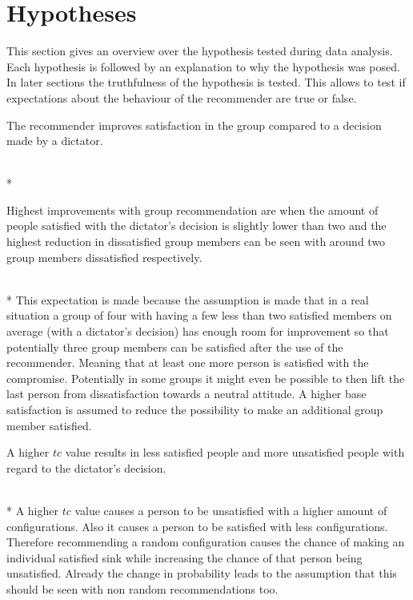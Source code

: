 \section{Hypotheses}
\label{sec:Evaluation:Hypotheses}

This section gives an overview over the hypothesis tested during data analysis. Each hypothesis is followed by an explanation to why the hypothesis was posed. In later sections the truthfulness of the hypothesis is tested. This allows to test if expectations about the behaviour of the recommender are true or false.

\begin{hypothesis}
    \begin{itshape}
        The recommender improves satisfaction in the group compared to a decision made by a dictator.
    \end{itshape} \medskip \\* 
    
\end{hypothesis}

\begin{hypothesis}
    \begin{itshape}
        \label{hyp:Evaluation:MaximumMinimum} Highest improvements with group recommendation are when the amount of people satisfied with the dictator's decision is slightly lower than two and the highest reduction in dissatisfied group members can be seen with around two group members dissatisfied respectively.
    \end{itshape} \medskip \\*    
    This expectation is made because the assumption is made that in a real situation a group of four with having a few less than two satisfied members on average (with a dictator's decision) has enough room for improvement so that potentially three group members can be satisfied after the use of the recommender. Meaning that at least one more person is satisfied with the compromise. Potentially in some groups it might even be possible to then lift the last person from dissatisfaction towards a neutral attitude. A higher base satisfaction is assumed to reduce the possibility to make an additional group member satisfied.
\end{hypothesis}


\begin{hypothesis}
    \begin{itshape}
        \label{hyp:Evaluation:HigherTcLessSatisfied} A higher $tc$ value results in less satisfied people and more unsatisfied people with regard to the dictator's decision.
    \end{itshape} \medskip \\*
    A higher $tc$ value causes a person to be unsatisfied with a higher amount of configurations. Also it causes a person to be satisfied with less configurations. Therefore recommending a random configuration causes the chance of making an individual satisfied sink while increasing the chance of that person being unsatisfied. Already the change in probability leads to the assumption that this should be seen with non random recommendations too.
\end{hypothesis}

